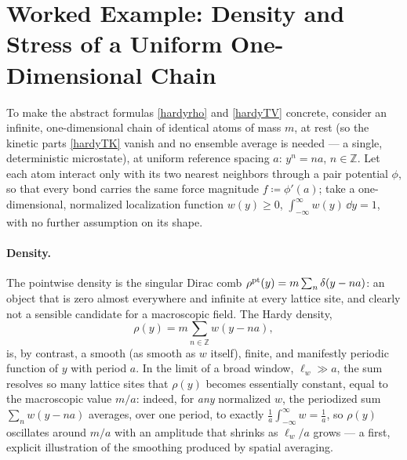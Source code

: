 \section{Worked Example: Density and Stress of a Uniform One-Dimensional Chain}\label{ex:hardychain}

To make the abstract formulas \eqref{hardyrho} and \eqref{hardyTV} concrete, consider an infinite, one-dimensional chain of identical atoms of mass $m$, at rest (so the kinetic parts \eqref{hardyTK} vanish and no ensemble average is needed --- a single, deterministic microstate), at uniform reference spacing $a$: $y^n = na$, $n\in\mathbb Z$. Let each atom interact only with its two nearest neighbors through a pair potential $\phi$, so that every bond carries the same force magnitude $f\coloneqq\phi'(a)$; take a one-dimensional, normalized localization function $w(y)\geq0$, $\int_{-\infty}^\infty w(y)\,\dd y=1$, with no further assumption on its shape.

\paragraph{Density.} The pointwise density is the singular Dirac comb $\rho^{\rm pt}(y)=m\sum_n\delta(y-na)$: an object that is zero almost everywhere and infinite at every lattice site, and clearly not a sensible candidate for a macroscopic field. The Hardy density,
\begin{equation}
	\rho(y) = m\sum_{n\in\mathbb Z} w(y-na),
\end{equation}
is, by contrast, a smooth (as smooth as $w$ itself), finite, and manifestly periodic function of $y$ with period $a$. In the limit of a broad window, $\ell_w\gg a$, the sum resolves so many lattice sites that $\rho(y)$ becomes essentially constant, equal to the macroscopic value $m/a$: indeed, for \textit{any} normalized $w$, the periodized sum $\sum_n w(y-na)$ averages, over one period, to exactly $\frac1a\int_{-\infty}^\infty w=\frac1a$, so $\rho(y)$ oscillates around $m/a$ with an amplitude that shrinks as $\ell_w/a$ grows --- a first, explicit illustration of the smoothing produced by spatial averaging.

